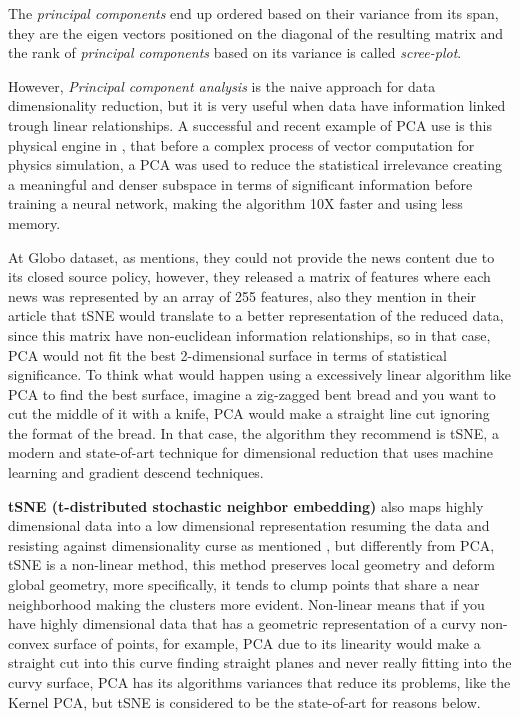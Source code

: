 \documentclass[ecp,tc,english]{iiufrgs}
\begin{document}
    The \textit{principal components} end up ordered based on their variance from its span, they are the eigen vectors positioned on the diagonal of the resulting matrix and the rank of \textit{principal components} based on its variance is called \textit{scree-plot}.

    However, \textit{Principal component analysis} is the naive approach for data dimensionality reduction, but it is very useful when data have information linked trough linear relationships.
    A successful and recent example of PCA use is this physical engine in \cite{10.1145/3309486.3340245}, that before a complex process of vector computation for physics simulation, a PCA was used to reduce the statistical irrelevance creating a meaningful and denser subspace in terms of significant information before training a neural network, making the algorithm 10X faster and using less memory.
    
    At Globo dataset, as \cite{deSouzaPereiraMoreira:2018:CDL:3240323.3240331} mentions, they could not provide the news content due to its closed source policy, however, they released a matrix of features where each news was represented by an array of 255 features, also they mention in their article that tSNE would translate to a better representation of the reduced data, since this matrix have non-euclidean information relationships, so in that case, PCA would not fit the best 2-dimensional surface in terms of statistical significance.
    To think what would happen using a excessively linear algorithm like PCA to find the best surface, imagine a zig-zagged bent bread and you want to cut the middle of it with a knife, PCA would make a straight line cut ignoring the format of the bread. In that case, the algorithm they recommend is tSNE, a modern and state-of-art technique for dimensional reduction that uses machine learning and gradient descend techniques.
    
    \textbf{tSNE (t-distributed stochastic neighbor embedding)} also maps highly dimensional data into a low dimensional representation resuming the data and resisting against dimensionality curse as mentioned \cite{10.1093/imamat/24.1.59}, but differently from PCA, tSNE \cite{vanDerMaaten2008} is a non-linear method, this method preserves local geometry and deform global geometry, more specifically, it tends to clump points that share a near neighborhood making the clusters more evident.
    Non-linear means that if you have highly dimensional data that has a geometric representation of a curvy non-convex surface of points, for example, PCA due to its linearity would make a straight cut into this curve finding straight planes and never really fitting into the curvy surface, PCA has its algorithms variances that reduce its problems, like the Kernel PCA, but tSNE is considered to be the state-of-art for reasons below.
\end{document}
